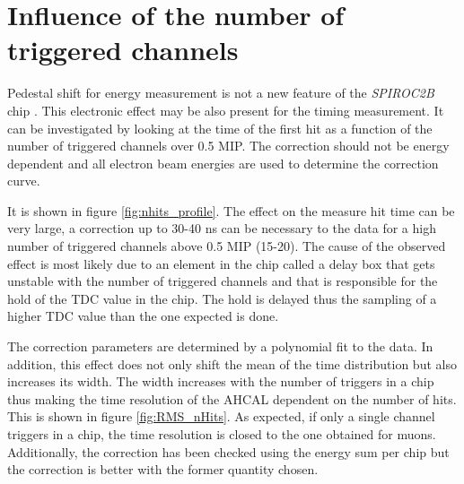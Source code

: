 \section{Influence of the number of triggered channels}
\label{subsec:ped_shift}

Pedestal shift for energy measurement is not a new feature of the \textit{SPIROC2B} chip \cite{Hartbrich2012}. This electronic effect may be also present for the timing measurement. It can be investigated by looking at the time of the first hit as a function of the number of triggered channels over 0.5 MIP. The correction should not be energy dependent and all electron beam energies are used to determine the correction curve.

It is shown in figure \ref{fig:nhits_profile}. The effect on the measure hit time can be very large, a correction up to 30-40 ns can be necessary to the data for a high number of triggered channels above 0.5 MIP (15-20). The cause of the observed effect is most likely due to an element in the chip called a delay box that gets unstable with the number of triggered channels and that is responsible for the hold of the TDC value in the chip. The hold is delayed thus the sampling of a higher TDC value than the one expected is done.

The correction parameters are determined by a polynomial fit to the data. In addition, this effect does not only shift the mean of the time distribution but also increases its width. The width increases with the number of triggers in a chip thus making the time resolution of the AHCAL dependent on the number of hits. This is shown in figure \ref{fig:RMS_nHits}. As expected, if only a single channel triggers in a chip, the time resolution is closed to the one obtained for muons. Additionally, the correction has been checked using the energy sum per chip but the correction is better with the former quantity chosen.

